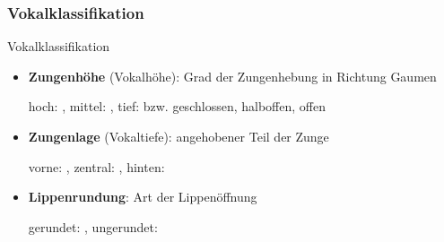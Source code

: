 \subsubsection{Vokalklassifikation}

\begin{frame}{Vokalklassifikation}

	\begin{itemize}
		\item \textbf{Zungenhöhe} (Vokalhöhe): Grad der Zungenhebung in Richtung Gaumen

		\ea hoch: \textipa{[ i: ]}, mittel: \textipa{[ o: ]}, tief: \textipa{[ a: ]} bzw. geschlossen, halboffen, offen
		\z

\pause 

		\item \textbf{Zungenlage} (Vokaltiefe): angehobener Teil der Zunge

		\ea vorne: \textipa{[ i: ]}, zentral: \textipa{[ a: ]}, hinten: \textipa{[ u: ]}
		\z

\pause 

		\item \textbf{Lippenrundung}: Art der Lippenöffnung

		\ea gerundet: \textipa{[ o: ]}, ungerundet: \textipa{[ i: ]}
		\z

		\bigskip
 
 \iftoggle{uebung}{
 	\item\textbf{ÜB:} Lesen Sie folgende Wörter mit gerundeten und mit gespreizten Lippen:
 Bühne, rühmen, Dünen, Stiele, Trieb, Möhre, Herd, Hefe
 } 
 {
 		\item\textbf{ÜB:} Lesen Sie folgende Wörter mit gerundeten und mit gespreizten Lippen:
 Bühne, rühmen, Dünen, Stiele, Trieb, Möhre, Herd, Hefe
 \pause
 
 Biene, Riemen, dienen, Stühle, trüb, Meere, hört, Höfe

 }%
 

\end{itemize}


\end{frame}

